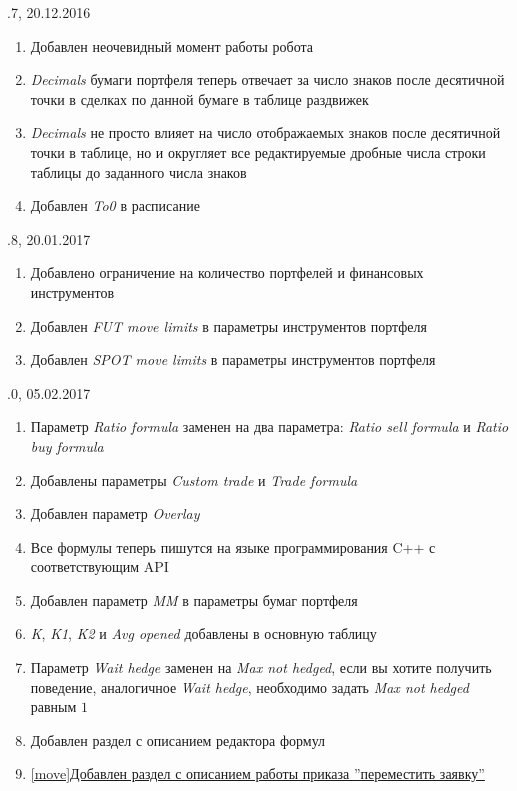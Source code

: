 \vspace{5mm}

.7, 20.12.2016
\begin{enumerate}
	\item Добавлен неочевидный момент работы робота
	\item \textit{Decimals} бумаги портфеля теперь отвечает за число знаков после десятичной точки в сделках по данной бумаге в таблице раздвижек
	\item \textit{Decimals} не просто влияет на число отображаемых знаков после десятичной точки в таблице, но и округляет все редактируемые дробные числа строки таблицы до заданного числа знаков
	\item Добавлен \textit{To0} в расписание
\end{enumerate}

\vspace{5mm}

.8, 20.01.2017
\begin{enumerate}
	\item Добавлено ограничение на количество портфелей и финансовых инструментов
	\item Добавлен \textit{FUT move limits} в параметры инструментов портфеля
	\item Добавлен \textit{SPOT move limits} в параметры инструментов портфеля
\end{enumerate}

\vspace{5mm}

.0, 05.02.2017
\begin{enumerate}
	\item Параметр \textit{Ratio formula} заменен на два параметра: \textit{Ratio sell formula} и \textit{Ratio buy formula}
	\item Добавлены параметры \textit{Custom trade} и \textit{Trade formula}
	\item Добавлен параметр \textit{Overlay}
	\item Все формулы теперь пишутся на языке программирования C++ с соответствующим API
	\item Добавлен параметр \textit{MM} в параметры бумаг портфеля
	\item \textit{K}, \textit{K1}, \textit{K2} и \textit{Avg opened} добавлены в основную таблицу
	\item Параметр \textit{Wait hedge} заменен на \textit{Max not hedged}, если вы хотите получить поведение, аналогичное \textit{Wait hedge}, необходимо задать \textit{Max not hedged} равным $1$
	\item Добавлен раздел с описанием редактора формул
	\item \hyperref[move]{\ref{move}Добавлен раздел с описанием работы приказа ''переместить заявку''}
\end{enumerate}

